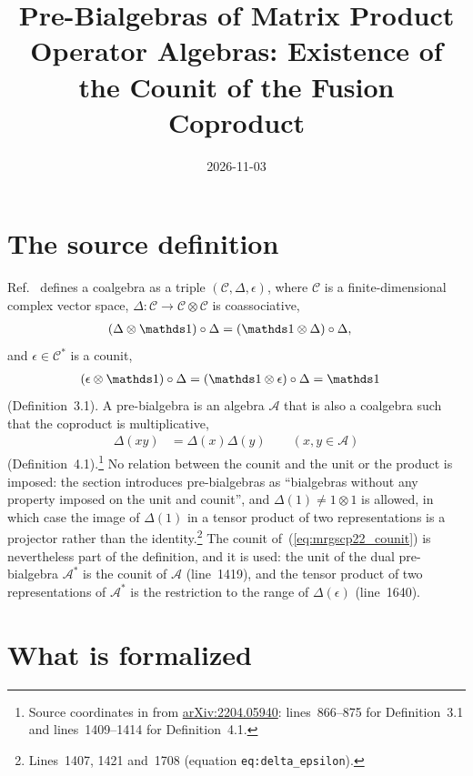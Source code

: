 \documentclass{article}
\title{Pre-Bialgebras of Matrix Product Operator Algebras: Existence of the Counit of the Fusion Coproduct}
\author{}
\date{2026-11-03}
\begin{document}
\maketitle
{}

\section{The source definition}

Ref.~\cite{Molnar2022MPOAlgebrasI} defines a coalgebra as a triple
$(\mathcal C,\Delta,\epsilon)$, where $\mathcal C$ is a finite-dimensional
complex vector space, $\Delta\colon\mathcal C\to\mathcal C\otimes\mathcal C$
is coassociative,
\begin{align}
    (\Delta\otimes\Id)\circ\Delta
     & =(\Id\otimes\Delta)\circ\Delta,
    \label{eq:mrgscp22_coassoc}
\end{align}
and $\epsilon\in\mathcal C^*$ is a counit,
\begin{align}
    (\epsilon\otimes\Id)\circ\Delta
     & =(\Id\otimes\epsilon)\circ\Delta
    =\Id
    \label{eq:mrgscp22_counit}
\end{align}
(Definition~3.1).  A pre-bialgebra is an algebra $\mathcal A$ that is also
a coalgebra such that the coproduct is multiplicative,
\begin{align}
    \Delta(xy)
     & =\Delta(x)\Delta(y)
    \qquad (x,y\in\mathcal A)
    \label{eq:mrgscp22_mult}
\end{align}
(Definition~4.1).\footnote{Source coordinates in  from
    \href{https://arxiv.org/abs/2204.05940}{arXiv:2204.05940}:
    lines~866--875 for Definition~3.1 and lines~1409--1414 for
    Definition~4.1.}
No relation between the counit and the unit or the product is imposed:
the section introduces pre-bialgebras as ``bialgebras without any property
imposed on the unit and counit'', and $\Delta(1)\neq1\otimes1$ is allowed,
in which case the image of $\Delta(1)$ in a tensor product of two
representations is a projector rather than the identity.\footnote{Lines~1407, 1421 and~1708
    (equation \texttt{eq:delta\_epsilon}).}
The counit of~(\ref{eq:mrgscp22_counit}) is nevertheless part of the
definition, and it is used: the unit of the dual pre-bialgebra
$\mathcal A^*$ is the counit of $\mathcal A$ (line~1419), and the tensor
product of two representations of $\mathcal A^*$ is the restriction to the
range of $\Delta(\epsilon)$ (line~1640).

\section{What is formalized}
\end{document}
